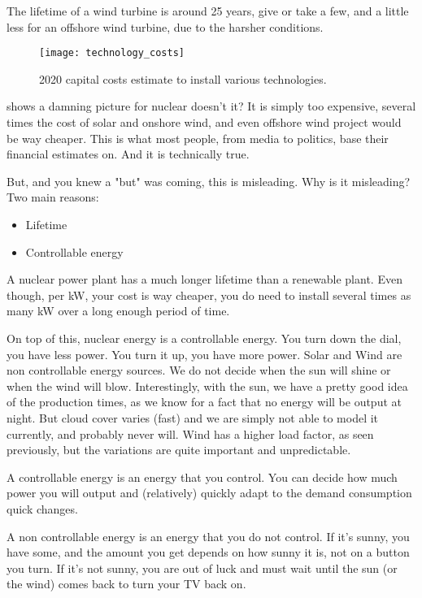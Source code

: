 The lifetime of a wind turbine is around 25 years, give or take a few, and a little less for an offshore wind turbine, due to the harsher conditions.



\begin{figure}[hb]
	\texttt{[image: technology\_costs]}
	\caption[2020 capital costs estimate to install various technologies]{2020 capital costs estimate to install various technologies.}
\end{figure}


 shows a damning picture for nuclear doesn't it? It is simply too expensive, several times the cost of solar and onshore wind, and even offshore wind project would be way cheaper. This is what most people, from media to politics, base their financial estimates on. And it is technically true.

But, and you knew a "but" was coming, this is misleading. Why is it misleading? Two main reasons:


\begin{itemize}
	\item Lifetime
	\item Controllable energy
\end{itemize}

A nuclear power plant has a much longer lifetime than a renewable plant. Even though, per kW, your cost is way cheaper, you do need to install several times as many kW over a long enough period of time.

On top of this, nuclear energy is a controllable energy. You turn down the dial, you have less power. You turn it up, you have more power. Solar and Wind are non controllable energy sources. We do not decide when the sun will shine or when the wind will blow. Interestingly, with the sun, we have a pretty good idea of the production times, as we know for a fact that no energy will be output at night. But cloud cover varies (fast) and we are simply not able to model it currently, and probably never will. Wind has a higher load factor, as seen previously, but the variations are quite important and unpredictable.


\begin{kaobox}[frametitle=Controllable versus Non Controllable]
A controllable energy is an energy that you control. You can decide how much power you will output and (relatively) quickly adapt to the demand consumption quick changes.

A non controllable energy is an energy that you do not control. If it's sunny, you have some, and the amount you get depends on how sunny it is, not on a button you turn. If it's not sunny, you are out of luck and must wait until the sun (or the wind) comes back to turn your TV back on. 
\end{kaobox}


